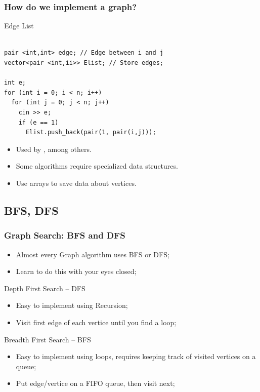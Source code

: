 \begin{frame}[fragile]
  \frametitle{How do we implement a graph?}
  \begin{block}{Edge List}
\begin{verbatim}

pair <int,int> edge; // Edge between i and j
vector<pair <int,ii>> Elist; // Store edges;

int e;
for (int i = 0; i < n; i++)
  for (int j = 0; j < n; j++)
    cin >> e;
    if (e == 1)
      Elist.push_back(pair(1, pair(i,j)));
\end{verbatim}
\end{block}
    \vfill

    \begin{itemize}
    \item Used by , among others.
    \item Some algorithms require specialized data structures.
    \item Use arrays to save data about vertices.
    \end{itemize}
\end{frame}


\subsection{BFS, DFS}
\begin{frame}
  \frametitle{Graph Search: BFS and DFS}
    \begin{itemize}
    \item Almost every Graph algorithm uses BFS or DFS;
    \item Learn to do this with your eyes closed;
    \end{itemize}

  \begin{block}{Depth First Search -- DFS}
    \begin{itemize}
    \item Easy to implement using Recursion;
    \item Visit first edge of each vertice until you find a loop;
    \end{itemize}
  \end{block}

  \begin{block}{Breadth First Search -- BFS}
    \begin{itemize}
    \item Easy to implement using loops, requires keeping track of
      visited vertices on a queue;
    \item Put edge/vertice on a FIFO queue, then visit next;
    \end{itemize}
  \end{block}
\end{frame}

